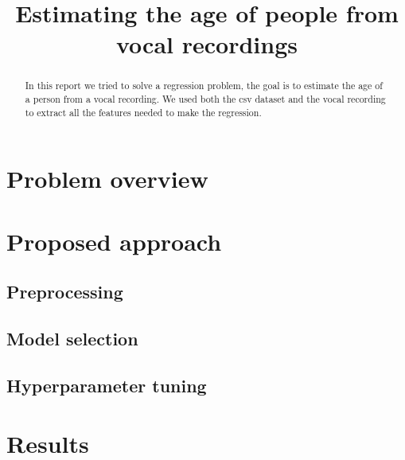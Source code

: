 \documentclass[conference]{IEEEtran}
\begin{document}
\title{Estimating the age of people from vocal recordings}

\author{
\and
{}
}

\maketitle

\begin{abstract}
In this report we tried to solve a regression problem, the goal is to estimate the age of a person from a vocal recording. We used both the csv dataset and the vocal recording to extract all the features needed to make the regression.
\end{abstract}

\section{Problem overview}


\section{Proposed approach}
\subsection{Preprocessing}

\subsection{Model selection}

\subsection{Hyperparameter tuning}




\section{Results}

\end{document}
